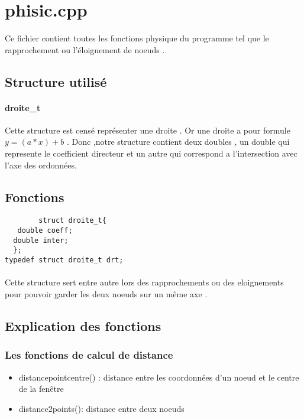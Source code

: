 \documentclass[a4paper,10pt]{report}
\begin{document}
  \section{phisic.cpp}
    Ce fichier contient toutes les fonctions physique du programme tel que le rapprochement ou l'éloignement de noeuds . 
    \subsection{Structure utilisé}
      \paragraph{droite_t}
	 
	  Cette structure est censé représenter une droite . 
	 Or une droite a pour formule  $y = (a * x) + b$ .
	  Donc ,notre structure contient deux doubles , un double qui represente le coefficient directeur et un autre qui correspond a l'intersection avec l'axe des ordonnées.   \subsection{Fonctions}
	  \begin{scriptsize}%
	   \begin{verbatim}
	    struct droite_t{
   double coeff;
  double inter;
  };
typedef struct droite_t drt;
	   \end{verbatim}

	   
	  \end{scriptsize}
      \paragraph{}
	Cette structure sert entre autre lors des rapprochements ou des eloignements pour pouvoir garder les deux noeuds sur un même axe .
	
	
      \subsection{Explication des fonctions}
	\subsubsection{Les fonctions de calcul de distance}
	  \begin{itemize}
	   \item distancepointcentre() :  distance entre les coordonnées d'un noeud et le centre de la fenêtre  
	   \item distance2points(): distance entre deux noeuds 
	  \end{itemize}
\end{document}
